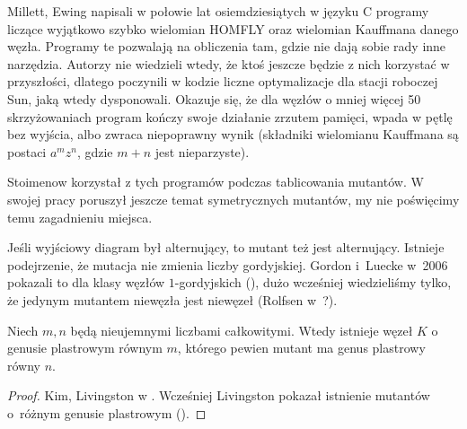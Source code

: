 Millett, Ewing napisali w połowie lat osiemdziesiątych w języku C programy liczące wyjątkowo szybko wielomian HOMFLY oraz wielomian Kauffmana danego węzła.
Programy te pozwalają na obliczenia tam, gdzie nie dają sobie rady inne narzędzia.
Autorzy nie wiedzieli wtedy, że ktoś jeszcze będzie z nich korzystać w przyszłości, dlatego poczynili w kodzie liczne optymalizacje dla stacji roboczej Sun, jaką wtedy dysponowali.
Okazuje się, że dla węzłów o mniej więcej 50 skrzyżowaniach program kończy swoje działanie zrzutem pamięci, wpada w pętlę bez wyjścia, albo zwraca niepoprawny wynik (składniki wielomianu Kauffmana są postaci $a^m z^n$, gdzie $m + n$ jest nieparzyste).

Stoimenow korzystał z tych programów podczas tablicowania mutantów.
W swojej pracy poruszył jeszcze temat symetrycznych mutantów, my nie poświęcimy temu zagadnieniu miejsca.

Jeśli wyjściowy diagram był alternujący, to mutant też jest alternujący.
Istnieje podejrzenie, że mutacja nie zmienia liczby gordyjskiej.
Gordon i~Luecke w~2006 pokazali to dla klasy węzłów $1$-gordyjskich (\cite{gordon06}), dużo wcześniej wiedzieliśmy tylko, że jedynym mutantem niewęzła jest niewęzeł (Rolfsen w~\cite{rolfsen93}?).

\begin{proposition}
    Niech $m, n$ będą nieujemnymi liczbami całkowitymi.
    Wtedy istnieje węzeł $K$ o genusie plastrowym równym $m$, którego pewien mutant ma genus plastrowy równy $n$.
\end{proposition}

\begin{proof}
    Kim, Livingston w \cite{kim05}.
    Wcześniej Livingston pokazał istnienie mutantów o~różnym genusie plastrowym (\cite{livingston83}).
\end{proof}

